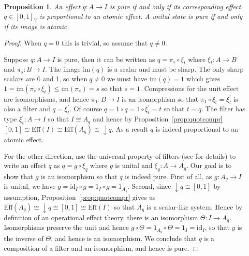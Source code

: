 \documentclass[b5paper,onecolumn,12pt,accepted=2019-05-03, issue=1, volume=1, shorttitle=papers/compositionality-1-1]{compositionalityarticle}
\newcounter{counter}
\numberwithin{counter}{section}
\newtheorem{proposition}[counter]{Proposition}
\newcommand{\pred}{\text{Eff}}
\newcommand{\id}{\text{id}}
\newcommand{\im}[1]{\text{im}(#1)}
\begin{document}
\begin{proposition} \label{prop:purestate}
	An effect $q:A\rightarrow I$ is pure if and only if its corresponding effect $q\in [0,1]_V$ is proportional to an atomic effect. A unital state is pure if and only if its image is atomic.
\end{proposition}
\begin{proof}
    When $q=0$ this is trivial, so assume that $q\neq 0$.

	Suppose $q:A\rightarrow I$ is pure, then it can be written as $q=\pi_s\circ \xi_t$ where $\xi_t: A\rightarrow B$ and $\pi_s:B\rightarrow I$. 
    The image $\im{q}$ is a scalar and must be sharp. The only sharp scalars are 0 and 1, so when $q\neq 0$ we must have $\im{q}=1$ which gives $1=\im{\pi_s\circ\xi_{t}}\leq \im{\pi_s} = s$ so that $s=1$. Compressions for the unit effect are isomorphisms, and hence $\pi_1:B\rightarrow I$ is an isomorphism so that $\pi_1\circ \xi_t = \xi_t^\prime$ is also a filter and $q=\xi_t^\prime$. 
    Of course $q=1\circ q = 1\circ \xi_t^\prime = t$ so that $t=q$. 
    The filter has type $\xi_t^\prime:A\rightarrow I$ so that $I\cong A_q$ and hence by Proposition~\ref{prop:quotcompr} $[0,1]\cong \pred(I) \cong \pred(A_q) \cong \downarrow q$. As a result $q$ is indeed proportional to an atomic effect. 
    
    For the other direction, use the universal property of filters (see \cite[197VII]{basthesis} for details) to write an effect $q$ as $q=g\circ\xi_{q}$ where $g$ is unital and $\xi_{q}:A\rightarrow A_q$. Our goal is to show that $g$ is an isomorphism so that $q$ is indeed pure. First of all, as $g:A_q\rightarrow I$ is unital, we have $g = \id_I\circ g = 1_I\circ g = 1_{A_q}$. Second, since $\downarrow q \cong [0,1]$ by assumption, Proposition~\ref{prop:quotcompr} gives us $\pred(A_q)\cong \downarrow q \cong [0,1] \cong \pred(I)$ so that $A_q$ is a scalar-like system. Hence by definition of an operational effect theory, there is an isomorphism $\Theta:I\rightarrow A_q$. Isomorphisms preserve the unit and hence $g\circ\Theta = 1_{A_q}\circ\Theta = 1_I = \id_I$, so that $g$ is the inverse of $\Theta$, and hence is an isomorphism. We conclude that $q$ is a composition of a filter and an isomorphism, and hence is pure.
    


\end{proof}
\end{document}
